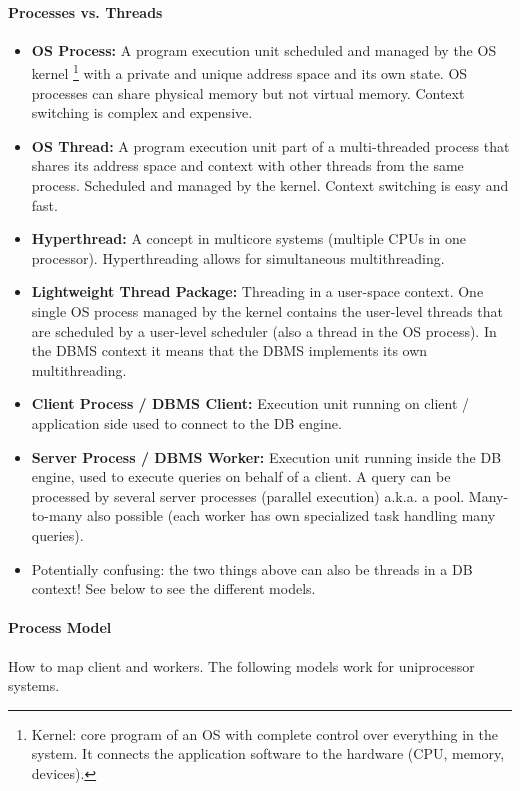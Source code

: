 \paragraph{Processes vs. Threads}
\begin{itemize}
    \item \textbf{OS Process:} A program execution unit scheduled and managed by the OS kernel \footnote{Kernel: core program of an OS with complete control over everything in the system. It connects the application software to the hardware (CPU, memory, devices).} with a private and unique address space and its own state. OS processes can share physical memory but not virtual memory. Context switching is complex and expensive.
    \item \textbf{OS Thread:} A program execution unit part of a multi-threaded process that shares its address space and context with other threads from the same process. Scheduled and managed by the kernel. Context switching is easy and fast.
    \item \textbf{Hyperthread:} A concept in multicore systems (multiple CPUs in one processor). Hyperthreading allows for simultaneous multithreading. %
    \item \textbf{Lightweight Thread Package:} Threading in a user-space context. One single OS process managed by the kernel contains the user-level threads that are scheduled by a user-level scheduler (also a thread in the OS process). In the DBMS context it means that the DBMS implements its own multithreading.
    \item \textbf{Client Process / DBMS Client:} Execution unit running on client / application side used to connect to the DB engine.
    \item \textbf{Server Process / DBMS Worker:} Execution unit running inside the DB engine, used to execute queries on behalf of a client. A query can be processed by several server processes (parallel execution) a.k.a. a pool. Many-to-many also possible (each worker has own specialized task handling many queries).
    \item Potentially confusing: the two things above can also be threads in a DB context! See below to see the different models.
\end{itemize}

\paragraph{Process Model}
How to map client and workers. The following models work for uniprocessor systems.

